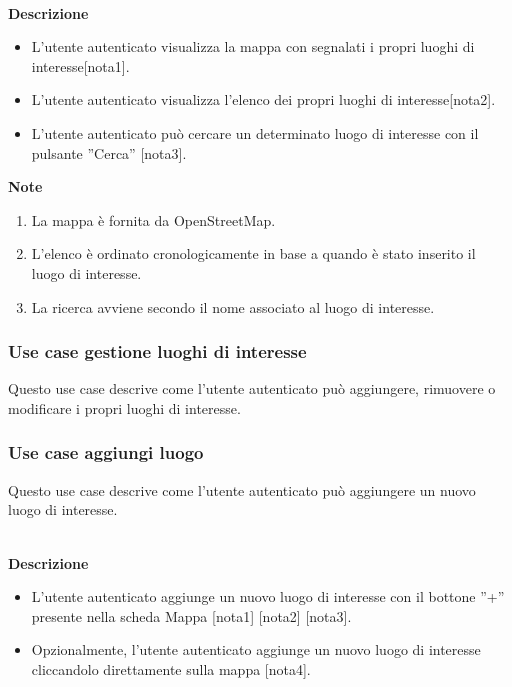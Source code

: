 \documentclass[a4paper,12pt]{article}
\begin{document}
\textbf{\\Descrizione}
\begin{itemize} \setlength\itemsep{0.01em}
\item L'utente autenticato visualizza la mappa con segnalati i propri luoghi di interesse[nota1].
\item L'utente autenticato visualizza l'elenco dei propri luoghi di interesse[nota2].
\item L'utente autenticato può cercare un determinato luogo di interesse con il pulsante ''Cerca'' [nota3].
\end{itemize}

\textbf{Note}
\begin{enumerate} \setlength\itemsep{0.01em}
\item La mappa è fornita da OpenStreetMap.
\item L'elenco è ordinato cronologicamente in base a quando è stato inserito il luogo di interesse.
\item La ricerca avviene secondo il nome associato al luogo di interesse.
\end{enumerate}




\subsubsection*{Use case gestione luoghi di interesse}

Questo use case descrive come l'utente autenticato può aggiungere, rimuovere o modificare i propri luoghi di interesse.



\subsubsection*{Use case aggiungi luogo}

Questo use case descrive come l'utente autenticato può aggiungere un nuovo luogo di interesse.

\textbf{\\Descrizione}
\begin{itemize} \setlength\itemsep{0.01em}
\item L'utente autenticato aggiunge un nuovo luogo di interesse con il bottone ''+'' presente nella scheda Mappa [nota1] [nota2] [nota3].
\item Opzionalmente, l'utente autenticato aggiunge un nuovo luogo di interesse cliccandolo direttamente sulla mappa [nota4].
\end{itemize}
\end{document}
